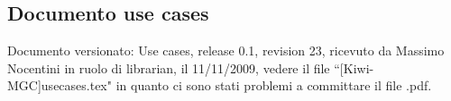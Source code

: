 \subsection{Documento use cases}
Documento versionato: Use cases, release 0.1, revision 23, ricevuto da
Massimo Nocentini in ruolo di librarian, il 11/11/2009, vedere il file
``[Kiwi-MGC]usecases.tex" in quanto ci sono stati problemi a committare il file
.pdf.
